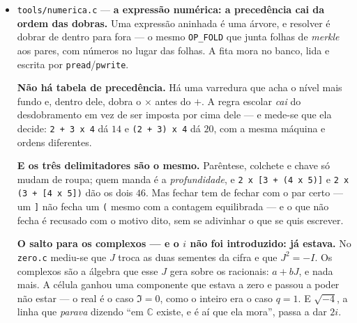 \documentclass[11pt]{article}
\newcommand{\code}[1]{\texttt{\small #1}}
\theoremstyle{plain}
\theoremstyle{remark}
\begin{document}
\begin{itemize}
\textbf{E o chicote não se degrada com o comprimento.} O produto de $n$ cópias de
$A_1 = \left[\begin{smallmatrix}1&1\\1&0\end{smallmatrix}\right]$ tem determinante alternando
$\pm 1$, sempre; a soma das duas raízes é o traço e o produto é o determinante. \emph{O que
degradaria a cifra seria um determinante a encolher, e ele não encolhe.} Por fim: a cifra é
infinita e todo truncamento é finito e exato --- o que é infinito é a \emph{régua}, não a coisa
medida, e aqui isso aparece no sítio onde a régua nasce.

\textbf{E fecha o que ficou aberto no resolvedor:} lá $1/0$ \emph{para}, porque se $0\cdot x$
fosse $1$ a estrutura colapsava. Aqui vê-se a outra metade --- $0/0$ não colapsa nada, é a classe
inteira. \emph{Dividir por zero é sair do corpo; dividir o zero é ficar com tudo.}

\item \code{tools/numerica.c} --- \textbf{a expressão numérica: a precedência cai da ordem
das dobras.} Uma expressão aninhada é uma árvore, e resolver é dobrar de dentro para fora --- o
mesmo \code{OP\_FOLD} que junta folhas de \emph{merkle} aos pares, com números no lugar das
folhas. A fita mora no banco, lida e escrita por \code{pread}/\code{pwrite}.

\textbf{Não há tabela de precedência.} Há uma varredura que acha o nível mais fundo e, dentro
dele, dobra o $\times$ antes do $+$. A regra escolar \emph{cai} do desdobramento em vez de ser
imposta por cima dele --- e mede-se que ela decide: \code{2 + 3 x 4} dá $14$ e
\code{(2 + 3) x 4} dá $20$, com a mesma máquina e ordens diferentes.

\textbf{E os três delimitadores são o mesmo.} Parêntese, colchete e chave só mudam de roupa;
quem manda é a \emph{profundidade}, e \code{2 x [3 + (4 x 5)]} e \code{2 x (3 + [4 x 5])} dão
os dois $46$. Mas fechar tem de fechar com o par certo --- um \code{]} não fecha um \code{(}
mesmo com a contagem equilibrada --- e o que não fecha é recusado com o motivo dito, sem se
adivinhar o que se quis escrever.

\textbf{O salto para os complexos --- e o $i$ não foi introduzido: já estava.} No
\code{zero.c} mediu-se que $J$ troca as duas sementes da cifra e que $J^2 = -I$. Os complexos são
a álgebra que esse $J$ gera sobre os racionais: $a + bJ$, e nada mais. A célula ganhou uma
componente que estava a zero e passou a poder não estar --- o real é o caso $\Im = 0$, como o
inteiro era o caso $q = 1$. E $\sqrt{-4}$, a linha que \emph{parava} dizendo ``em $\mathbb{C}$
existe, e é aí que ela mora'', passa a dar $2i$.


\end{itemize}
\end{document}

